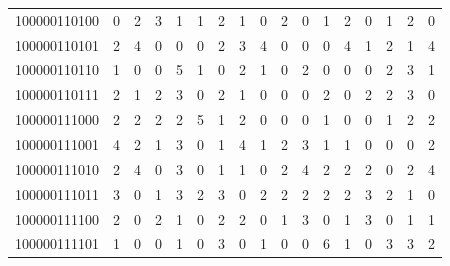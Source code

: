 \documentclass[10pt,a4paper]{article}
\begin{document}
\begin{longtable}{ |c|c|c|c|c|c|c|c|c|c|c|c|c|c|c|c|c| }
    100000110100              & 0                            & 2                                & 3                            & 1                              & 1   & 2   & 1   & 0   & 2   & 0   & 1   & 2   & 0   & 1   & 2   & 0   \\
    100000110101              & 2                            & 4                                & 0                            & 0                              & 0   & 2   & 3   & 4   & 0   & 0   & 0   & 4   & 1   & 2   & 1   & 4   \\
    100000110110              & 1                            & 0                                & 0                            & 5                              & 1   & 0   & 2   & 1   & 0   & 2   & 0   & 0   & 0   & 2   & 3   & 1   \\
    100000110111              & 2                            & 1                                & 2                            & 3                              & 0   & 2   & 1   & 0   & 0   & 0   & 2   & 0   & 2   & 2   & 3   & 0   \\
    100000111000              & 2                            & 2                                & 2                            & 2                              & 5   & 1   & 2   & 0   & 0   & 0   & 1   & 0   & 0   & 1   & 2   & 2   \\
    100000111001              & 4                            & 2                                & 1                            & 3                              & 0   & 1   & 4   & 1   & 2   & 3   & 1   & 1   & 0   & 0   & 0   & 2   \\
    100000111010              & 2                            & 4                                & 0                            & 3                              & 0   & 1   & 1   & 0   & 2   & 4   & 2   & 2   & 2   & 0   & 2   & 4   \\
    100000111011              & 3                            & 0                                & 1                            & 3                              & 2   & 3   & 0   & 2   & 2   & 2   & 2   & 2   & 3   & 2   & 1   & 0   \\
    100000111100              & 2                            & 0                                & 2                            & 1                              & 0   & 2   & 2   & 0   & 1   & 3   & 0   & 1   & 3   & 0   & 1   & 1   \\
    100000111101              & 1                            & 0                                & 0                            & 1                              & 0   & 3   & 0   & 1   & 0   & 0   & 6   & 1   & 0   & 3   & 3   & 2   \\

\end{longtable}
\end{document}
